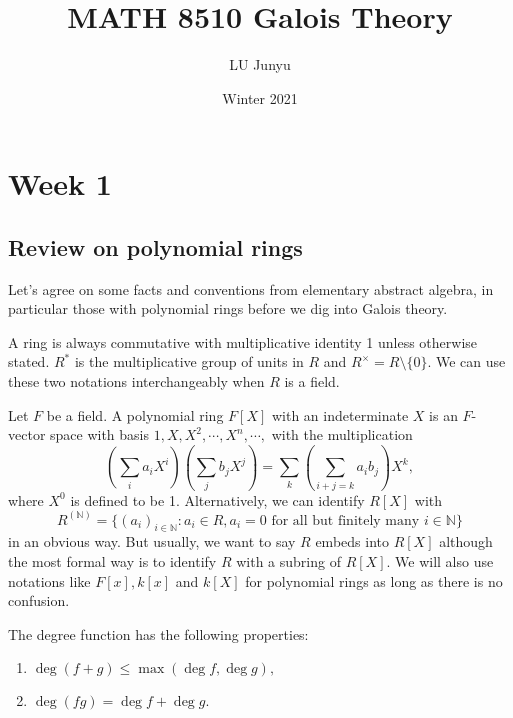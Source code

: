 \documentclass[12pt]{report}
\theoremstyle{definition}
\newcommand{\NN}{\mathbb{N}}
\begin{document}
\title{MATH 8510 Galois Theory}
\author{LU Junyu}
\date{Winter 2021}


\maketitle

\tableofcontents

\chapter*{Week 1}
\setcounter{chapter}{1}
\section{Review on polynomial rings}

Let's agree on some facts and conventions from elementary abstract algebra, in particular those with polynomial rings before we dig into Galois theory.

\smallskip

A ring is always commutative with multiplicative identity 1 unless otherwise stated. $R^*$ is the multiplicative group of units in $R$ and $R^\times = R\setminus \{0\}$. We can use these two notations interchangeably when $R$ is a field.

\smallskip

Let $F$ be a field. A polynomial ring $F[X]$ with an indeterminate $X$ is an $F$-vector space with basis $1,X,X^2,\cdots,X^n,\cdots,$ with the multiplication $$(\sum_i a_iX^i)(\sum_j b_j X^j) =  \sum_k (\sum_{i+j=k}a_ib_j)X^k,$$ where $X^0$ is defined to be 1. Alternatively, we can identify $R[X]$ with $$R^{(\NN)}=\{(a_i)_{i\in\NN}: a_i\in R, a_i=0 \mbox{ for all but finitely many }i\in\NN\}$$ in an obvious way. But usually, we want to say $R$ embeds into $R[X]$ although the most formal way is to identify $R$ with a subring of $R[X]$.  We will also use notations like $F[x], k[x]$ and $k[X]$ for polynomial rings as long as there is no confusion.

The degree function has the following properties:
\begin{enumerate}
	\item $\deg(f+g) \leq \max(\deg f,\deg g),$
	\item $\deg(fg)=\deg f+\deg g.$
\end{enumerate}
\end{document}
